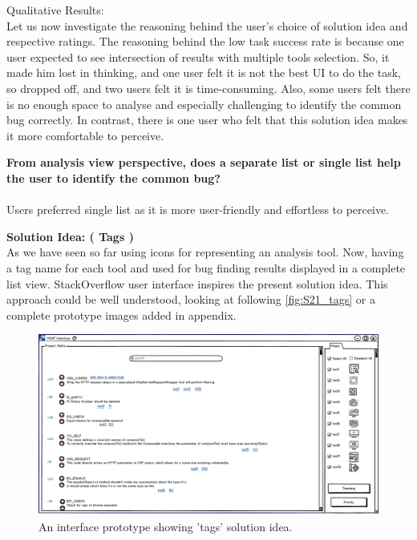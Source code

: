 Qualitative Results: \\

Let us now investigate the reasoning behind the user’s choice of solution idea and respective ratings. The reasoning behind the low task success rate is because one user expected to see intersection of results with multiple tools selection. So, it made him lost in thinking, and one user felt it is not the best UI to do the task, so dropped off, and two users felt it is time-consuming. Also, some users felt there is no enough space to analyse and especially challenging to identify the common bug correctly. In contrast, there is one user who felt that this solution idea makes it more comfortable to perceive. \\

\begin{myboxi}{{\textbf{From analysis view perspective, does a separate list or single list help the user to identify the common bug?}}}
\\ \\	Users preferred single list as it is more user-friendly and effortless to perceive.
\end{myboxi}	
	
\textbf{Solution Idea: ( Tags )} \\

As we have seen so far using icons for representing an analysis tool. Now, having a tag name for each tool and used for bug finding results displayed in a complete list view. StackOverflow user interface inspires the present solution idea. This approach could be well understood, looking at following \autoref{fig:S21_tags} or a complete prototype images added in appendix.  \\



\begin{figure}[hbt!]
	\centering
	\includegraphics[width=\linewidth]{figures/solution_ideas_snaps/S21_tags}
	\caption{An interface prototype showing 'tags' solution idea.}
	\label{fig:S21_tags}
\end{figure}


